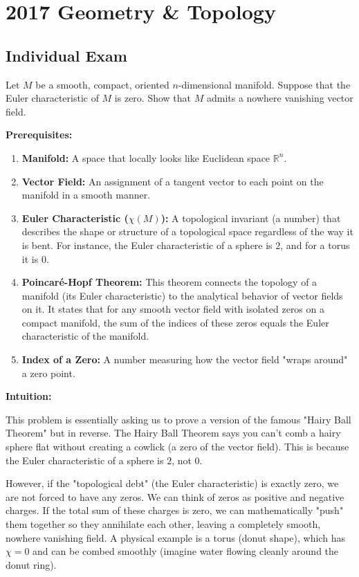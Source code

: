 \section{2017 Geometry \& Topology}

\subsection{Individual Exam}

\begin{exercise}
\label{geometry:2017:1}
Let $M$ be a smooth, compact, oriented $n$-dimensional manifold. Suppose that the Euler characteristic of $M$ is zero. Show that $M$ admits a nowhere vanishing vector field.
\end{exercise}

\begin{solution}
\textbf{Prerequisites:}
\begin{enumerate}
    \item \textbf{Manifold:} A space that locally looks like Euclidean space $\mathbb{R}^n$.
    \item \textbf{Vector Field:} An assignment of a tangent vector to each point on the manifold in a smooth manner.
    \item \textbf{Euler Characteristic ($\chi(M)$):} A topological invariant (a number) that describes the shape or structure of a topological space regardless of the way it is bent. For instance, the Euler characteristic of a sphere is $2$, and for a torus it is $0$.
    \item \textbf{Poincaré-Hopf Theorem:} This theorem connects the topology of a manifold (its Euler characteristic) to the analytical behavior of vector fields on it. It states that for any smooth vector field with isolated zeros on a compact manifold, the sum of the indices of these zeros equals the Euler characteristic of the manifold.
    \item \textbf{Index of a Zero:} A number measuring how the vector field "wraps around" a zero point.
\end{enumerate}

\textbf{Intuition:}

This problem is essentially asking us to prove a version of the famous "Hairy Ball Theorem" but in reverse. The Hairy Ball Theorem says you can't comb a hairy sphere flat without creating a cowlick (a zero of the vector field). This is because the Euler characteristic of a sphere is $2$, not $0$.

However, if the "topological debt" (the Euler characteristic) is exactly zero, we are not forced to have any zeros. We can think of zeros as positive and negative charges. If the total sum of these charges is zero, we can mathematically "push" them together so they annihilate each other, leaving a completely smooth, nowhere vanishing field. A physical example is a torus (donut shape), which has $\chi=0$ and can be combed smoothly (imagine water flowing cleanly around the donut ring).


\end{solution}
